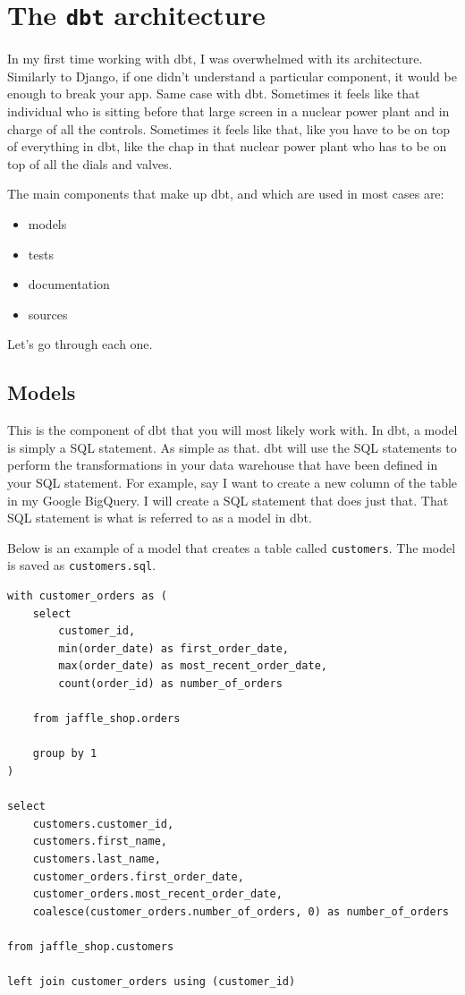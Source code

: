 \documentclass[
]{book}
\begin{document}
\hypertarget{the-dbt-architecture}{%
\chapter{\texorpdfstring{The \texttt{dbt} architecture}{The dbt architecture}}\label{the-dbt-architecture}}

In my first time working with dbt, I was overwhelmed with its architecture. Similarly to Django, if one didn't understand a particular component, it would be enough to break your app. Same case with dbt. Sometimes it feels like that individual who is sitting before that large screen in a nuclear power plant and in charge of all the controls. Sometimes it feels like that, like you have to be on top of everything in dbt, like the chap in that nuclear power plant who has to be on top of all the dials and valves.

The main components that make up dbt, and which are used in most cases are:

\begin{itemize}
\item
  models
\item
  tests
\item
  documentation
\item
  sources
\end{itemize}

Let's go through each one.

\hypertarget{models}{%
\section{Models}\label{models}}

This is the component of dbt that you will most likely work with. In dbt, a model is simply a SQL statement. As simple as that. dbt will use the SQL statements to perform the transformations in your data warehouse that have been defined in your SQL statement. For example, say I want to create a new column of the table in my Google BigQuery. I will create a SQL statement that does just that. That SQL statement is what is referred to as a model in dbt.

Below is an example of a model that creates a table called \texttt{customers}. The model is saved as \texttt{customers.sql}.

\begin{verbatim}
with customer_orders as (
    select
        customer_id,
        min(order_date) as first_order_date,
        max(order_date) as most_recent_order_date,
        count(order_id) as number_of_orders

    from jaffle_shop.orders

    group by 1
)

select
    customers.customer_id,
    customers.first_name,
    customers.last_name,
    customer_orders.first_order_date,
    customer_orders.most_recent_order_date,
    coalesce(customer_orders.number_of_orders, 0) as number_of_orders

from jaffle_shop.customers

left join customer_orders using (customer_id)
\end{verbatim}
\end{document}
